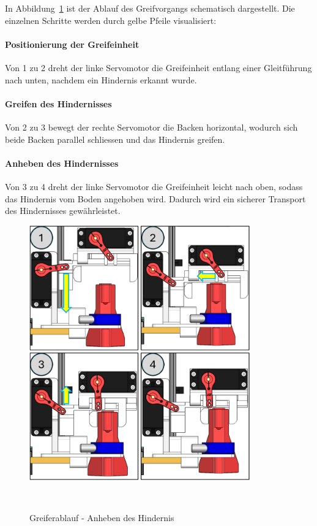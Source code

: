 \documentclass[main.tex]{subfiles} %
\begin{document}
\newpage

In Abbildung~\ref{fig:Greiferablauf} ist der Ablauf des Greifvorgangs schematisch dargestellt. Die einzelnen Schritte werden durch gelbe Pfeile visualisiert:

\paragraph{Positionierung der Greifeinheit} 
Von 1 zu 2 dreht der linke Servomotor die Greifeinheit entlang einer Gleitführung nach unten, nachdem ein Hindernis erkannt wurde.

\paragraph{Greifen des Hindernisses} 

Von 2 zu 3 bewegt der rechte Servomotor die Backen horizontal, wodurch sich beide Backen parallel schliessen und das Hindernis greifen.

\paragraph{Anheben des Hindernisses} 

Von 3 zu 4 dreht der linke Servomotor die Greifeinheit leicht nach oben, sodass das Hindernis vom Boden angehoben wird. 
Dadurch wird ein sicherer Transport des Hindernisses gewährleistet.

\begin{figure}[H]
    \centering
    \includegraphics[width=0.85\textwidth]{Greiferablauf.png}
    \caption{Greiferablauf - Anheben des Hindernis}~\label{fig:Greiferablauf}
\end{figure}
\end{document}
